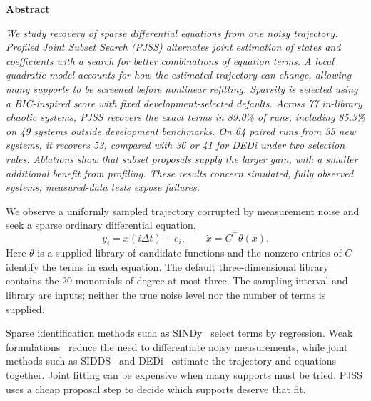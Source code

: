 \documentclass[letterpaper,10pt,twocolumn]{article}
\makeatletter
\renewcommand\section{\@startsection{section}{1}{\z@}{-2.5ex plus -0.8ex minus -0.2ex}{1.1ex plus 0.2ex}{\normalfont\large\bfseries}}
\makeatother
\begin{document}
\twocolumn[{\centering\vspace*{0.35in}
{\large\bfseries PJSS: Sparse Equation Discovery from a Noisy Trajectory\par}
\vspace{0.20in}}]

\begin{center}\textbf{\large Abstract}\end{center}
\noindent\textit{We study recovery of sparse differential equations from one noisy trajectory. Profiled Joint Subset Search (PJSS) alternates joint estimation of states and coefficients with a search for better combinations of equation terms. A local quadratic model accounts for how the estimated trajectory can change, allowing many supports to be screened before nonlinear refitting. Sparsity is selected using a BIC-inspired score with fixed development-selected defaults. Across 77 in-library chaotic systems, PJSS recovers the exact terms in 89.0\% of runs, including 85.3\% on 49 systems outside development benchmarks. On 64 paired runs from 35 new systems, it recovers 53, compared with 36 or 41 for DEDi under two selection rules. Ablations show that subset proposals supply the larger gain, with a smaller additional benefit from profiling. These results concern simulated, fully observed systems; measured-data tests expose failures.}

\section{The task and method}
We observe a uniformly sampled trajectory corrupted by measurement noise and seek a sparse ordinary differential equation,
\begin{equation}
 y_i=x(i\Delta t)+e_i,\qquad \dot x=C^\top\theta(x).
\end{equation}
Here $\theta$ is a supplied library of candidate functions and the nonzero entries of $C$ identify the terms in each equation. The default three-dimensional library contains the 20 monomials of degree at most three. The sampling interval and library are inputs; neither the true noise level nor the number of terms is supplied.

Sparse identification methods such as SINDy~\cite{sindy} select terms by regression. Weak formulations~\cite{weak} reduce the need to differentiate noisy measurements, while joint methods such as SIDDS~\cite{sidds} and DEDi~\cite{dedi} estimate the trajectory and equations together. Joint fitting can be expensive when many supports must be tried. PJSS uses a cheap proposal step to decide which supports deserve that fit.
\end{document}

